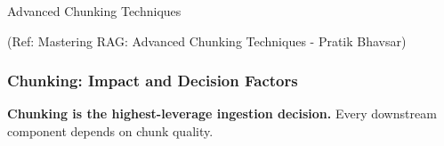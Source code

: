 
\begin{frame}[fragile]\frametitle{}
\begin{center}
{\Large Advanced Chunking Techniques}

\vspace{0.3em}
{\tiny (Ref: Mastering RAG: Advanced Chunking Techniques - Pratik Bhavsar)}
\end{center}
\end{frame}


\begin{frame}[fragile]\frametitle{Chunking: Impact and Decision Factors}

\textbf{Chunking is the highest-leverage ingestion decision.} Every downstream component depends on chunk quality.


\end{frame}
